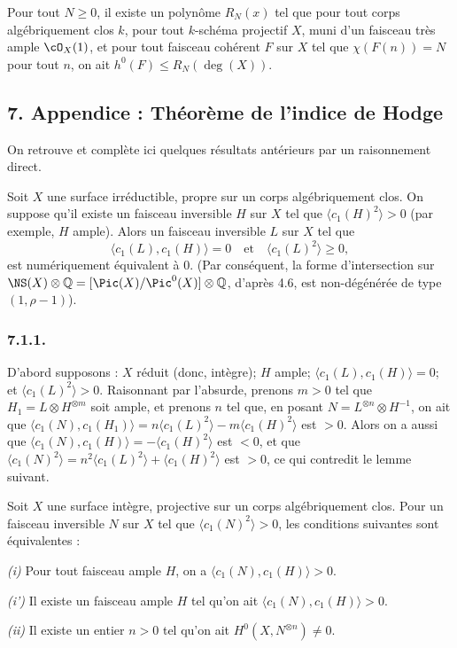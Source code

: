 \begin{corollaire}[6.14. (L.~Hermann)]
Pour tout $N \geq 0$, il existe un polyn\^ome $R_N(x)$ tel que pour tout corps alg\'ebriquement clos $k$, pour tout $k$-sch\'ema projectif $X$, muni d'un faisceau tr\`es ample $\cO_X(1)$, et pour tout faisceau coh\'erent $F$ sur $X$ tel que $\chi(F(n)) = N$ pour tout $n$, on ait $h^0(F) \leq R_N(\deg(X))$.
\end{corollaire}

\newpage
\subsection*{7. Appendice : Th\'eor\`eme de l'indice de Hodge}

On retrouve et compl\`ete ici quelques r\'esultats ant\'erieurs par un raisonnement direct.

\begin{theoreme}[7.1]
Soit $X$ une surface irr\'eductible, propre sur un corps alg\'ebriquement clos. On suppose qu'il existe un faisceau inversible $H$ sur $X$ tel que $\langle c_1(H)^2 \rangle > 0$ (par exemple, $H$ ample). Alors un faisceau inversible $L$ sur $X$ tel que
\[
\langle c_1(L), c_1(H) \rangle = 0 \quad \text{et} \quad \langle c_1(L)^2 \rangle \geq 0,
\]
est num\'eriquement \'equivalent \`a $0$. (Par cons\'equent, la forme d'intersection sur $\NS(X) \otimes \mathbb{Q} = [\Pic(X)/\Pic^0(X)] \otimes \mathbb{Q}$, d'apr\`es 4.6, est non-d\'eg\'en\'er\'ee de type $(1, \rho-1)$).
\end{theoreme}

\subsubsection*{7.1.1.}
D'abord supposons : $X$ r\'eduit (donc, int\`egre); $H$ ample; $\langle c_1(L), c_1(H) \rangle = 0$; et $\langle c_1(L)^2 \rangle > 0$. Raisonnant par l'absurde, prenons $m > 0$ tel que $H_1 = L \otimes H^{\otimes m}$ soit ample, et prenons $n$ tel que, en posant $N = L^{\otimes n} \otimes H^{-1}$, on ait que $\langle c_1(N), c_1(H_1) \rangle = n\langle c_1(L)^2 \rangle - m\langle c_1(H)^2 \rangle$ est $> 0$. Alors on a aussi que $\langle c_1(N), c_1(H) \rangle = -\langle c_1(H)^2 \rangle$ est $< 0$, et que $\langle c_1(N)^2 \rangle = n^2\langle c_1(L)^2 \rangle + \langle c_1(H)^2 \rangle$ est $> 0$, ce qui contredit le lemme suivant.

\begin{lemme}[7.1.2]
Soit $X$ une surface int\`egre, projective sur un corps alg\'ebriquement clos. Pour un faisceau inversible $N$ sur $X$ tel que $\langle c_1(N)^2 \rangle > 0$, les conditions suivantes sont \'equivalentes :

\emph{(i)} Pour tout faisceau ample $H$, on a $\langle c_1(N), c_1(H) \rangle > 0$.

\emph{(i')} Il existe un faisceau ample $H$ tel qu'on ait $\langle c_1(N), c_1(H) \rangle > 0$.

\emph{(ii)} Il existe un entier $n > 0$ tel qu'on ait $H^0(X, N^{\otimes n}) \neq 0$.
\end{lemme}

